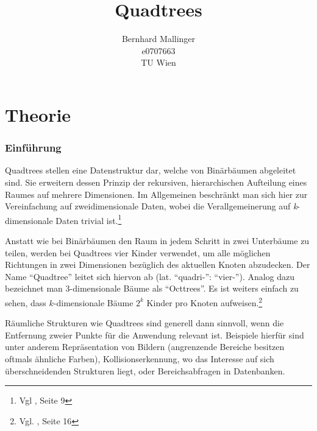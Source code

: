 \documentclass[%
			fontsize=12pt,%
			paper=a4,%
			DIV11,
			liststotoc,
			bibtotoc,
			draft=false,%
			titlepage
			]{scrartcl}
\title{Quadtrees}
\author{Bernhard Mallinger \\ e0707663 \\ TU Wien}
\newcommand{\zit}[3]{#1 \cite{#2}, #3}
\newcommand{\footzit}[3]{\footnote{\zit{#1}{#2}{#3}}}
\begin{document}
\maketitle

\tableofcontents 

\newpage

%
%
%
%
%
%
%
%
%


\part{Theorie}
\section{Einführung}
Quadtrees stellen eine Datenstruktur dar, welche von Binärbäumen abgeleitet sind. Sie erweitern dessen Prinzip der rekursiven, hierarchischen Aufteilung eines Raumes auf mehrere Dimensionen. 
Im Allgemeinen beschränkt man sich hier zur Vereinfachung auf zweidimensionale Daten, wobei die Verallgemeinerung auf \textit{k}-dimensionale Daten trivial ist.\footzit{Vgl}{DBLP:journals/acta/FinkelB74}{Seite 9}

Anstatt wie bei Binärbäumen den Raum in jedem Schritt in zwei Unterbäume zu teilen, werden bei Quadtrees vier Kinder verwendet, um alle möglichen Richtungen in zwei Dimensionen bezüglich des aktuellen Knoten abzudecken. Der Name "`Quadtree"' leitet sich hiervon ab (lat. "`quadri-"': "`vier-"'). 
Analog dazu bezeichnet man 3-dimensionale Bäume als "`Octtrees"'. Es ist weiters einfach zu sehen, dass $k$-dimensionale Bäume $2^k$ Kinder pro Knoten aufweisen.\footzit{Vgl.}{Bentley:1979}{Seite 16}

Räumliche Strukturen wie Quadtrees sind generell dann sinnvoll, wenn die Entfernung zweier Punkte für die Anwendung relevant ist.
Beispiele hierfür sind unter anderem Repräsentation von Bildern (angrenzende Bereiche besitzen oftmals ähnliche Farben), Kollisionserkennung, wo das Interesse auf sich überschneidenden Strukturen liegt, oder Bereichsabfragen in Datenbanken.
\end{document}
